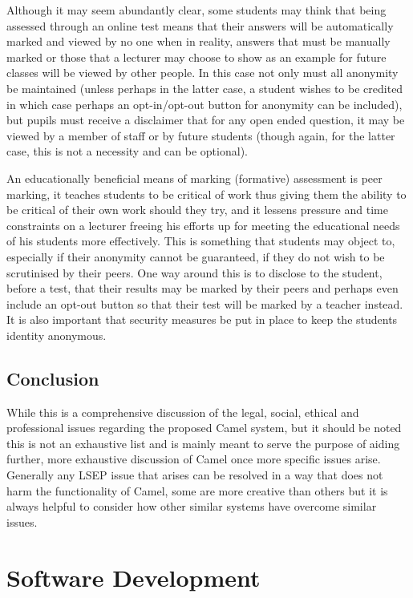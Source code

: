 Although it may seem abundantly clear, some students may think that being assessed through an online test means that their answers will be automatically marked and viewed by no one when in reality, answers that must be manually marked or those that a lecturer may choose to show as an example for future classes will be viewed by other people. In this case not only must all anonymity be maintained (unless perhaps in the latter case, a student wishes to be credited in which case perhaps an opt-in/opt-out button for anonymity can be included), but pupils must receive a disclaimer that for any open ended question, it may be viewed by a member of staff or by future students (though again, for the latter case, this is not a necessity and can be optional).

An educationally beneficial means of marking (formative) assessment is peer marking, it teaches students to be critical of work thus giving them the ability to be critical of their own work should they try, and it lessens pressure and time constraints on a lecturer freeing his efforts up for meeting the educational needs of his students more effectively. This is something that students may object to, especially if their anonymity cannot be guaranteed, if they do not wish to be scrutinised by their peers. One way around this is to disclose to the student, before a test, that their results may be marked by their peers and perhaps even include an opt-out button so that their test will be marked by a teacher instead. It is also important that security measures be put in place to keep the students identity anonymous.


\subsection*{Conclusion}
While this is a comprehensive discussion of the legal, social, ethical and professional issues regarding the proposed Camel system, but it should be noted this is not an exhaustive list and is mainly meant to serve the purpose of aiding further, more exhaustive discussion of Camel once more specific issues arise. Generally any LSEP issue that arises can be resolved in a way that does not harm the functionality of Camel, some are more creative than others but it is always helpful to consider how other similar systems have overcome similar issues.

\section{Software Development}


